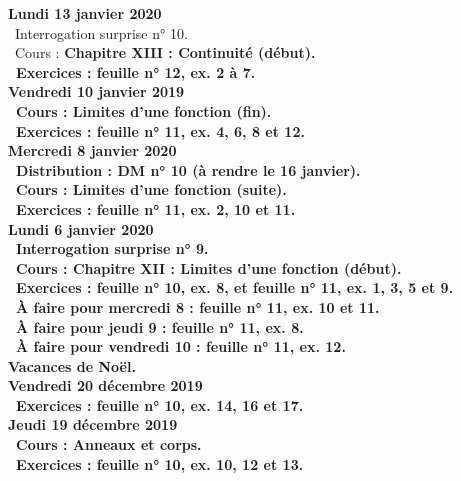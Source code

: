 \documentclass[12pt,a4paper]{article}
\begin{document}
\textbf{Lundi 13 janvier 2020} \\
\bu\ Interrogation surprise n° 10.\\
\noindent\bu\ Cours : \bf Chapitre XIII \rm : Continuité (début).\\
\bu\ Exercices : feuille n° 12, ex. 2 à 7.\vspace{.4cm}\\

\noindent\textbf{Vendredi 10 janvier 2019}\\
\bu\ Cours : Limites d'une fonction (fin).\\
\bu\ Exercices : feuille n° 11, ex. 4, 6, 8 et 12.\vspace{.4cm}\\

\noindent\textbf{Mercredi 8 janvier 2020} \\
\bu\ Distribution : DM n° 10 (à rendre le 16 janvier).\\
\bu\ Cours : Limites d'une fonction (suite).\\
\bu\ Exercices : feuille n° 11, ex. 2, 10 et 11.\vspace{.4cm}\\

\noindent\textbf{Lundi 6 janvier 2020} \\
\bu\ Interrogation surprise n° 9.\\
\bu\ Cours : \bf Chapitre XII \rm : Limites d'une fonction (début).\\ 
\bu\ Exercices : feuille n° 10, ex. 8, et feuille n° 11, ex. 1, 3, 5 et 9.\\
\bu\ À faire pour mercredi 8 : feuille n° 11, ex. 10 et 11.\\
\bu\ À faire pour jeudi 9 : feuille n° 11, ex. 8.\\
\bu\ À faire pour vendredi 10 : feuille n° 11, ex. 12.\vspace{.4cm}\\ 

\noindent\textbf{\bf Vacances de Noël}.\vspace{.4cm}\\

\noindent\textbf{Vendredi 20 décembre 2019}\\
\bu\ Exercices : feuille n° 10, ex. 14, 16 et 17.\vspace{.4cm}\\

 \noindent\textbf{Jeudi 19 décembre 2019}\\
\bu\ Cours : Anneaux et corps.\\ 
\bu\ Exercices : feuille n° 10, ex. 10, 12 et 13.\vspace{.4cm}\\
  
\end{document}

